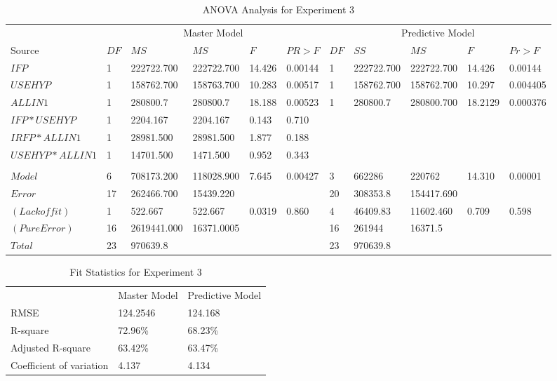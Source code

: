 \documentclass[preprint]{sigplanconf}
\begin{document}
\begin{table}
  \centering
  \begin{tabular}{llllll|lllll}
    \multicolumn{1}{c}{} & \multicolumn{5}{c|}{Master Model}&\multicolumn{5}{c}{Predictive Model} \\
    Source&$DF$&$MS$&$MS$&$F$&$PR>F$&$DF$&$SS$&$MS$&$F$&$Pr>F$ \\
    \hline
    $IFP$&1&222722.700&222722.700 &14.426&0.00144&1&222722.700&222722.700&14.426&0.00144\\
    $USEHYP$&1&158762.700&158763.700&10.283&0.00517&1&158762.700&158762.700&10.297&0.004405\\
    $ALLIN1$&1&280800.7&280800.7&18.188&0.00523&1&280800.7&280800.700&18.2129&0.000376\\
    $IFP*USEHYP$&1&2204.167&2204.167&0.143&0.710&&&&&\\
    $IRFP*ALLIN1$&1&28981.500&28981.500&1.877&0.188&&&&&\\
    $USEHYP*ALLIN1$&1&14701.500&1471.500&0.952&0.343&&&&&\\
    &&&&&&&&&& \\
    $Model$&6&708173.200&118028.900&7.645&0.00427&3&662286&220762&14.310&0.00001\\
    $Error$&17&262466.700&15439.220& &&20&308353.8&154417.690&&\\
    $(Lack of fit)$&1&522.667&522.667&0.0319&0.860&4&46409.83&11602.460&0.709&0.598\\
    $(Pure Error)$&16&2619441.000&16371.0005&&&16&261944&16371.5&&\\
    $Total$&23&970639.8& & & &23&970639.8&&& \\
  \end{tabular}
  \caption{ANOVA Analysis for Experiment 3}
  \label{tab:AnovaExperiment3}
\end{table}


\begin{table}
  \centering
  \begin{tabular}{l|ll}
    &Master Model&Predictive Model \\
    RMSE&124.2546&124.168\\
    R-square&72.96\%&68.23\% \\
    Adjusted R-square&63.42\%&63.47\% \\
    Coefficient of variation&4.137&4.134 \\
  \end{tabular}
  \caption{Fit Statistics for Experiment 3}
  \label{tab:FitStatsExperiment3}
\end{table}
\end{document}
